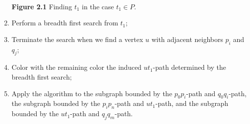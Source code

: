 \documentclass[11pt,letter]{article}
\begin{document}
\begin{enumerate}
\begin{center}
\hfill\\

\textbf{Figure 2.1} Finding $t_1$ in the case $t_1\in P$.
\end{center}

\item Perform a breadth first search from $t_1$;
\item Terminate the search when we find a vertex $u$ with adjacent neighbors $p_i$ and $q_j$;
\item Color with the remaining color the induced $ut_1$-path determined by the breadth first search;
\item Apply the algorithm to the subgraph bounded by the $p_0p_i$-path and $q_0q_i$-path, the subgraph
bounded by the $p_ip_n$-path and $ut_1$-path, and the subgraph bounded by the $ut_1$-path and $q_jq_m$-path.
\end{enumerate}
\end{document}
